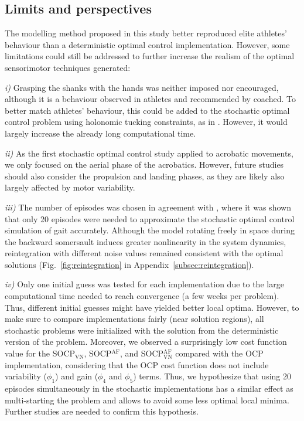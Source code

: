 \documentclass[10pt,letterpaper]{article}
\begin{document}
\subsection{Limits and perspectives}\label{subsec:limits}
The modelling method proposed in this study better reproduced elite athletes' behaviour than a deterministic optimal control implementation.
However, some limitations could still be addressed to further increase the realism of the optimal sensorimotor techniques generated:

\textit{i)} Grasping the shanks with the hands was neither imposed nor encouraged, although it is a behaviour observed in athletes and recommended by coached. To better match athletes' behaviour,  this could be added to the stochastic optimal control problem using holonomic tucking constraints, as in \cite{farr2025including}. However, it would largely increase the already long computational time.

\textit{ii)} As the first stochastic optimal control study applied to acrobatic movements, we only focused on the aerial phase of the acrobatics. However, future studies should also consider the propulsion and landing phases, as they are likely also largely affected by motor variability.

\textit{iii)} The number of episodes was chosen in agreement with \cite{koelewijn2020solution}, where it was shown that only 20 episodes were needed to approximate the stochastic optimal control simulation of gait accurately. Although the model rotating freely in space during the backward somersault induces greater nonlinearity in the system dynamics, reintegration with different noise values remained consistent with the optimal solutions (Fig.~\ref{fig:reintegration} in Appendix~\ref{subsec:reintegration}).

\textit{iv)} Only one initial guess was tested for each implementation due to the large computational time needed to reach convergence (a few weeks per problem). Thus, different initial guesses might have yielded better local optima. However, to make sure to compare implementations fairly (near solution regions), all stochastic problems were initialized with the solution from the deterministic version of the problem. Moreover, we observed a surprisingly low cost function value for the SOCP$_{\text{VN}}$, SOCP$^{\text{AF}}$, and SOCP$_{\text{VN}}^{\text{AF}}$ compared with the OCP implementation, considering that the OCP cost function does not include variability ($\phi_1$) and gain ($\phi_4$ and $\phi_5$) terms. Thus, we hypothesize that using 20 episodes simultaneously in the stochastic implementations has a similar effect as multi-starting the problem and allows to avoid some less optimal local minima. Further studies are needed to confirm this hypothesis.
\end{document}
